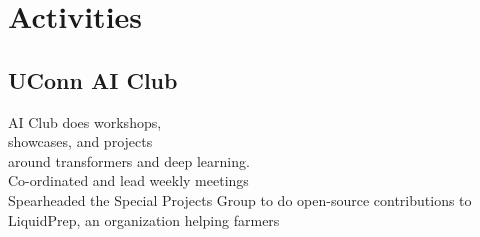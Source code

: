 \documentclass[]{resume-template}
\begin{document}
\begin{minipage}[t]{0.33\textwidth}


    \section{Activities}\label{sec:activities}

    \subsection{UConn AI Club}\label{subsec:uconn-ai-club}
    \textbullet{} AI Club does workshops,\\showcases, and projects \\around transformers and deep learning.\\
    \textbullet{} Co-ordinated and lead weekly meetings\\
    \textbullet{} Spearheaded the Special Projects Group to do open-source contributions to LiquidPrep, an organization helping farmers

    \vspace{\topsep}






\end{minipage}
\end{document}
